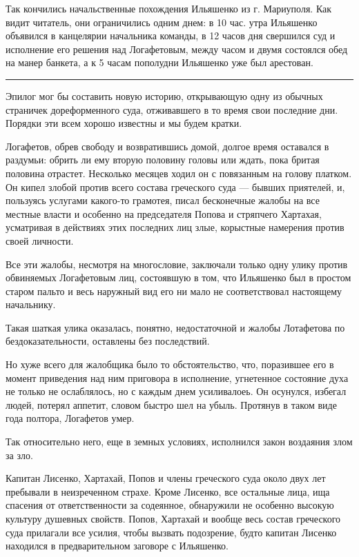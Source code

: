 \documentclass[a4paper,20pt]{report}
\begin{document}
Так кончились начальственные похождения Ильяшенко из г. Мариуполя. Как видит читатель, они
ограничились одним днем: в 10 час. утра Ильяшенко объявился в канцелярии начальника команды, в 12 часов дня
свершился суд и исполнение его решения над Логафетовым, между часом и двумя состоялся обед на манер банкета, а к 
5 часам пополудни Ильяшенко уже был арестован.

\par\noindent\rule{\textwidth}{0.4pt}

Эпилог мог бы составить новую историю, открывающую одну из обычных страничек дореформенного суда,
отживавшего в то время свои последние дни. Порядки эти всем хорошо известны и мы будем кратки.

Логафетов, обрев свободу и возвратившись домой, долгое время оставался в
раздумьи: обрить ли ему вторую половину головы или ждать, пока бритая половина
отрастет.  Несколько месяцев ходил он с повязанным на голову платком. Он кипел
злобой против всего состава греческого суда — бывших приятелей, и, пользуясь
услугами какого-то грамотея, писал бесконечные жалобы на все местные власти и
особенно на председателя Попова и стряпчего Хартахая, усматривая в действиях
этих последних лиц злые, корыстные намерения против своей личности.

Все эти жалобы, несмотря на многословие, заключали только одну улику против обвиняемых
Логафетовым лиц, состоявшую в том, что Ильяшенко был в простом
старом пальто и весь наружный вид его ни мало не соответствовал настоящему начальнику.

Такая шаткая улика оказалась, понятно, недостаточной
и жалобы Лотафетова по бездоказательности, оставлены без
последствий.

Но хуже всего для жалобщика было то обстоятельство, что, поразившее его в
момент приведения над ним приговора в исполнение, угнетенное состояние духа не
только не ослаблялось, но с каждым днем усиливалоеь. Он осунулся, избегал
людей, потерял аппетит, словом быстро шел на убыль. Протянув в таком виде года
полтора, Логафетов умер.

Так относительно него, еще в земных условиях,
исполнился закон воздаяния злом за зло.

Капитан Лисенко, Хартахай, Попов и члены греческого суда 
около двух лет пребывали в неизреченном страхе. Кроме Лисенко, все остальные лица, ища спасения
от ответственности за содеянное, обнаружили не особенно
высокую культуру душевных свойств. Попов, Хартахай
и вообще весь состав греческого суда прилагали все усилия, 
чтобы вызвать подозрение, будто капитан Лисенко находился 
в предварительном заговоре с Ильяшенко.
\end{document}

